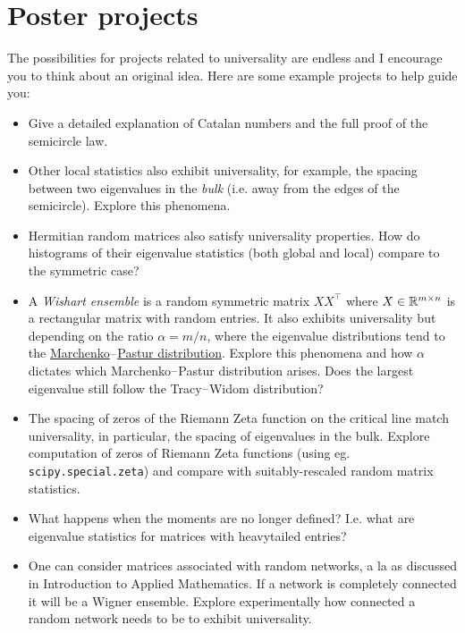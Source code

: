 \section{Poster projects}
The possibilities for projects related to universality are endless and I encourage you to think about an original idea. Here are some example projects to help guide you:

\begin{itemize}
\item[1. ] Give a detailed explanation of Catalan numbers and the full proof of the semicircle law.


\item[2. ] Other local statistics also exhibit universality, for example, the spacing between two eigenvalues in the \emph{bulk} (i.e. away from the edges of the semicircle). Explore this phenomena. 


\item[3. ] Hermitian random matrices also satisfy universality properties. How do histograms of their eigenvalue statistics (both global and local) compare to the symmetric case?


\item[4. ] A \emph{Wishart ensemble} is a random symmetric matrix $X X^\ensuremath{\top}$ where $X \in {\mathbb R}^{m \times n}$ is a rectangular matrix with random entries. It also exhibits universality but depending on the ratio $\ensuremath{\alpha} = m/n$, where the eigenvalue distributions tend to the \href{https://en.wikipedia.org/wiki/Marchenko\ensuremath{\endash}Pastur_distribution}{Marchenko\ensuremath{\endash}Pastur distribution}. Explore this phenomena and how $\ensuremath{\alpha}$ dictates which Marchenko\ensuremath{\endash}Pastur distribution arises. Does the largest eigenvalue still follow the Tracy\ensuremath{\endash}Widom distribution?


\item[5. ] The spacing of zeros of the Riemann Zeta function on the critical line match universality, in particular, the spacing of  eigenvalues in the bulk. Explore computation of zeros of Riemann Zeta functions (using eg. \texttt{scipy.special.zeta}) and compare with suitably-rescaled random matrix statistics.


\item[6. ] What happens when the moments are no longer defined? I.e. what are eigenvalue statistics for matrices with heavytailed entries?


\item[7. ] One can consider matrices associated with random networks, a la as discussed in Introduction to Applied Mathematics. If a network is completely connected it will be a Wigner ensemble. Explore experimentally how connected  a random network needs to be to exhibit universality.

\end{itemize}

